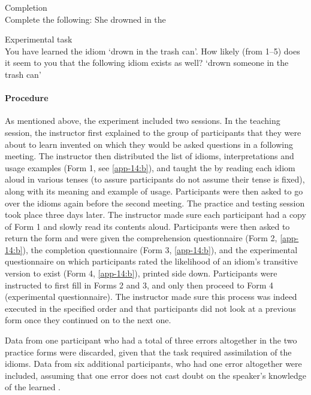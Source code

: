 \documentclass[output=paper]{langsci/langscibook}
\begin{document}
\ea\label{ex:key:20.21}Completion\\
    Complete the following: She drowned in the \underline{\hphantom{3em}}
\z

\ea\label{ex:key:20.22}Experimental task\\
    You have learned the idiom `drown in the trash can'. How likely (from 1--5)
    does it seem to you that the following idiom exists as well?
    \sn \enquote*{drown someone in the trash can}
\z

\paragraph*{Procedure} As mentioned above, the experiment included two
sessions. In the teaching session, the instructor first explained to the group
of participants that they were about to learn invented  on which they
would be asked questions in a following meeting. The instructor then
distributed the list of idioms, interpretations and usage examples (Form 1, see
\ref{app-14:b}), and taught the  by reading each idiom aloud in various
tenses (to assure participants do not assume their tense is fixed), along with
its meaning and example of usage. Participants were then asked to go over the
idioms again before the second meeting. The practice and testing session took
place three days later. The instructor made sure each participant had a copy of
Form 1 and slowly read its contents aloud. Participants were then asked to
return the form and were given the comprehension questionnaire (Form 2,
\ref{app-14:b}), the completion questionnaire (Form 3, \ref{app-14:b}), and the
experimental questionnaire on which participants rated the likelihood of an
idiom’s transitive version to exist (Form 4, \ref{app-14:b}), printed side
down.  Participants were instructed to first fill in Forms 2 and 3, and only
then proceed to Form 4 (experimental questionnaire). The instructor made sure
this process was indeed executed in the specified order and that participants
did not look at a previous form once they continued on to the next one.

Data from one participant who had a total of three errors altogether in the two
practice forms were discarded, given that the task required assimilation of the
idioms. Data from six additional participants, who had one error altogether were
included, assuming that one error does not cast doubt on the speaker’s
knowledge of the learned .
\end{document}
